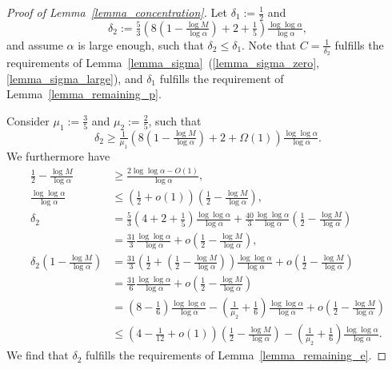 \documentclass{article}
\theoremstyle{plain}
\theoremstyle{remark}
\theoremstyle{plain}
\numberwithin{equation}{section}
\begin{document}
	\begin{proof}[Proof of Lemma~\ref{lemma_concentration}]
		Let $\delta_1:=\frac12$ and $$\delta_2:=\tfrac{5}{3}\left(8\left(1-\tfrac{\log M}{\log\alpha}\right)+2+\tfrac15\right)\tfrac{\log\log\alpha}{\log\alpha},$$ and assume $\alpha$ is large enough, such that $\delta_2\leq\delta_1$. Note that $C=\tfrac1{\delta_2}$ fulfills the requirements of Lemma~\ref{lemma_sigma}~(\ref{lemma_sigma_zero},\ref{lemma_sigma_large}), and $\delta_1$ fulfills the requirement of Lemma~\ref{lemma_remaining_p}.
		
		Consider $\mu_1:=\tfrac35$ and $\mu_2:=\tfrac25$, such that $$\delta_2\geq\tfrac1{\mu_1}\left(8\left(1-\tfrac{\log M}{\log\alpha}\right)+2+\Omega(1)\right)\tfrac{\log\log\alpha}{\log\alpha}.$$ We furthermore have
		\begin{align}
			\tfrac12-\tfrac{\log M}{\log\alpha}
			&\geq\tfrac{2\log\log\alpha-O(1)}{\log\alpha},
			\\\tfrac{\log\log\alpha}{\log\alpha}
			&\leq(\tfrac12+o(1))\left(\tfrac12-\tfrac{\log M}{\log\alpha}\right),
			\\\delta_2
			&=\tfrac{5}{3}(4+2+\tfrac15)\tfrac{\log\log\alpha}{\log\alpha}+\tfrac{40}{3}\tfrac{\log\log\alpha}{\log\alpha}\left(\tfrac12-\tfrac{\log M}{\log\alpha}\right)
			\\&=\tfrac{31}{3}\tfrac{\log\log\alpha}{\log\alpha}+o\left(\tfrac12-\tfrac{\log M}{\log\alpha}\right),
			\\\delta_2\left(1-\tfrac{\log M}{\log\alpha}\right)
			&=\tfrac{31}{3}\left(\tfrac12+\left(\tfrac12-\tfrac{\log M}{\log\alpha}\right)\right)\tfrac{\log\log\alpha}{\log\alpha}+o\left(\tfrac12-\tfrac{\log M}{\log\alpha}\right)
			\\&=\tfrac{31}{6}\tfrac{\log\log\alpha}{\log\alpha}+o\left(\tfrac12-\tfrac{\log M}{\log\alpha}\right)
			\\&=(8-\tfrac16)\tfrac{\log\log\alpha}{\log\alpha}-(\tfrac1{\mu_2}+\tfrac16)\tfrac{\log\log\alpha}{\log\alpha}+o\left(\tfrac12-\tfrac{\log M}{\log\alpha}\right)
			\\&\leq(4-\tfrac1{12}+o(1))\left(\tfrac12-\tfrac{\log M}{\log\alpha}\right)-(\tfrac1{\mu_2}+\tfrac16)\tfrac{\log\log\alpha}{\log\alpha}.
		\end{align}
		We find that $\delta_2$ fulfills the requirements of Lemma~\ref{lemma_remaining_e}.
		

\end{proof}
\end{document}
